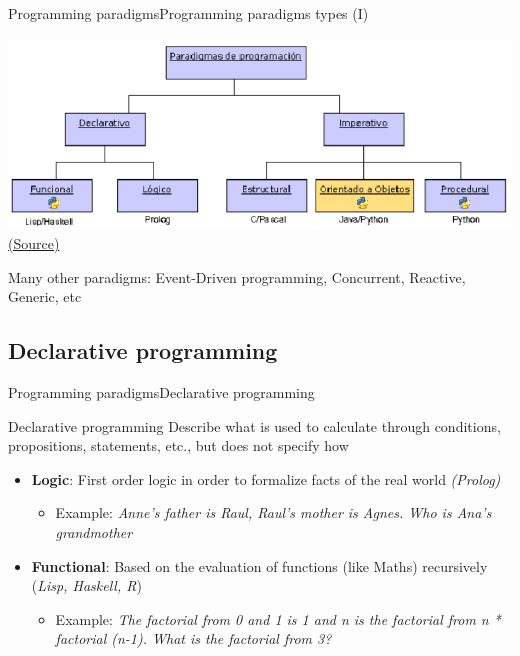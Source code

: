 \documentclass[10pt,compress]{beamer} %
\begin{document}
\begin{frame}{Programming paradigms}{Programming paradigms types (I)}
	\begin{center}
	\includegraphics[scale=0.4]{figs/paradigmas}\\
	\tiny{\href{http://www.computer.org/csdl/mags/it/2011/05/mit2011050030-abs.html}{(Source)}}\\
	\end{center}
	\normalsize{Many other paradigms: Event-Driven programming, Concurrent, Reactive, Generic, etc}
\end{frame}

\subsection{Declarative programming}
\begin{frame}{Programming paradigms}{Declarative programming}
	\begin{block}{Declarative programming}
Describe \alert{what} is used to calculate through conditions, propositions, statements, etc., but does not specify how
  	\end{block}
  	\begin{itemize}
  		\item \textbf{Logic}: First order logic in order to formalize facts of the real world \textit{(Prolog)}
  		\begin{itemize}
  			\item Example: \textit{Anne's father is Raul, Raul's mother is Agnes. Who is Ana's grandmother} 
  		\end{itemize}
  		\item \textbf{Functional}: Based on the evaluation of functions (like Maths) recursively  (\textit{Lisp, Haskell, R})
  		\begin{itemize}
  			\item Example: \textit{The factorial from 0 and 1 is 1 and n is the factorial from n * factorial (n-1). What is the factorial from 3?} 
  		\end{itemize}
  	\end{itemize}
\end{frame}
\end{document}
